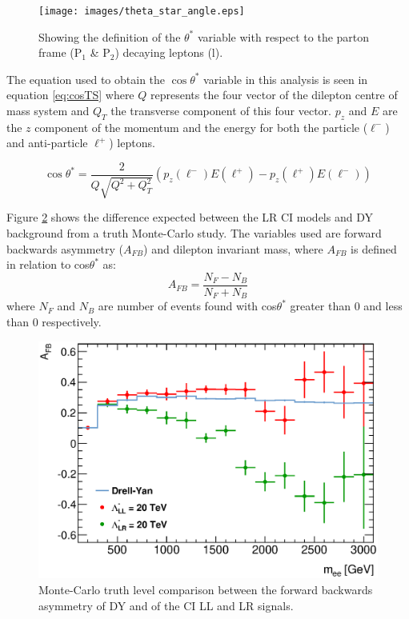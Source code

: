         \begin{figure}[h]
            \begin{center}
            \texttt{[image: images/theta\_star\_angle.eps]}
            \end{center}
            \caption{Showing the definition of the $\theta^{*}$ variable with respect to the parton frame (P$_1$ \& P$_2$) decaying leptons (l).}
            \label{fig:Thetastar}
        \end{figure}

        The equation used to obtain the $\cos{\theta^{*}}$ variable in this analysis is seen in equation \ref{eq:cosTS} where $Q$ represents the four vector of the dilepton centre of mass system and $Q_{T}$ the transverse component of this four vector. $p_{z}$ and $E$ are the $z$ component of the momentum and the energy for both the particle ($\ell^{-}$) and anti-particle $\ell^{+}$) leptons.

        \begin{equation}
            \cos{\theta^*} = 
                \frac{2}{Q \sqrt{Q^{2} + Q_{T}^{2}}} (p_{z}(\ell^{-})E(\ell^{+}) - p_{z}(\ell^{+})E(\ell^{-}))
            \label{eq:cosTS}
        \end{equation}


        Figure \ref{fig:theoryAFB} shows the difference expected between the LR CI models and DY background from a truth Monte-Carlo study. The variables used are forward backwards asymmetry ($A_{FB}$) and dilepton invariant mass, where $A_{FB}$ is defined in relation to cos$\theta^{*}$ as:
        \begin{equation}
            A_{FB} = 
                \frac{N_{F} - N_{B}}{N_{F} + N_{B}}
            \label{eq:AFB}
        \end{equation}
        where $N_{F}$ and $N_{B}$ are number of events found with cos$\theta^{*}$ greater than 0 and less than 0 respectively.
        
        \begin{figure}[h]
            \begin{center}
            \includegraphics[width=0.9\linewidth]{images/AFB_MC.eps}
            \end{center}
            \caption{Monte-Carlo truth level comparison between the forward backwards asymmetry of DY and of the CI LL and LR signals.}
            \label{fig:theoryAFB}
        \end{figure}

